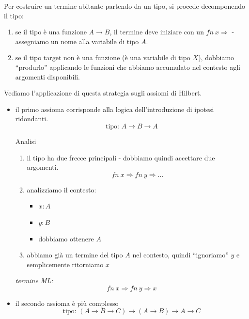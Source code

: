 \documentclass[a4paper,11pt]{report}
\begin{document}
Per costruire un termine abitante partendo da un tipo, si procede decomponendo il tipo:
\begin{enumerate}
    \item se il tipo è una funzione $A \to B$, il termine deve iniziare con un $fn \ x \Rightarrow$ - assegniamo un nome alla variabile di tipo $A$.
    \item se il tipo target non è una funzione (è una variabile di tipo $X$), dobbiamo ``produrlo'' applicando le funzioni che abbiamo accumulato nel contesto agli argomenti disponibili.
\end{enumerate}

Vediamo l'applicazione di questa strategia sugli assiomi di Hilbert.

\begin{itemize}
    \item il primo assioma corrisponde alla logica dell'introduzione di ipotesi ridondanti.
\[ \text{tipo: } A \to B \to A \]

\begin{gframe}{Analisi}{}
    \vspace{-1em}
    \begin{enumerate}
        \item il tipo ha due frecce principali - dobbiamo quindi accettare due argomenti.
        \[ fn \ x \Rightarrow fn \ y \Rightarrow \dots \]
        \item analizziamo il contesto:
        \begin{itemize}
            \item $x : A$
            \item $y : B$
            \item dobbiamo ottenere $A$
        \end{itemize}
        \item abbiamo già un termine del tipo \( A \) nel contesto, quindi ``ignoriamo'' \( y \) e semplicemente ritorniamo \( x \)
    \end{enumerate}
    \textit{termine ML:}
    \[ fn \ x \Rightarrow fn \ y \Rightarrow x \]
\end{gframe}

\item il secondo assioma è più complesso
\[ \text{tipo: } (A \to B \to C) \to (A \to B) \to A \to C \]


\end{itemize}
\end{document}
